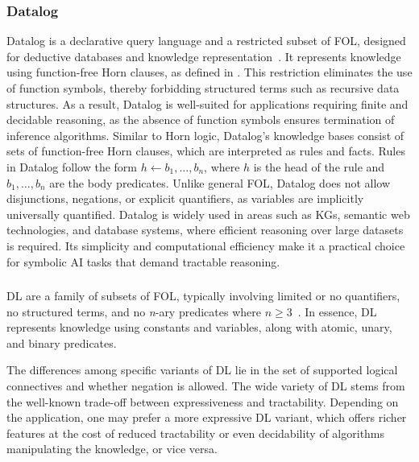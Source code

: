 \subsubsection{Datalog}\label{subsubsec:datalog}
%
Datalog is a declarative query language and a restricted subset of \gls{FOL}, designed for deductive databases and knowledge representation~\cite{DBLP:journals/jcss/AjtaiG94}.
%
It represents knowledge using function-free Horn clauses, as defined in .
%
This restriction eliminates the use of function symbols, thereby forbidding structured terms such as recursive data structures.
%
As a result, Datalog is well-suited for applications requiring finite and decidable reasoning, as the absence of function symbols ensures termination of inference algorithms.
%
Similar to Horn logic, Datalog's knowledge bases consist of sets of function-free Horn clauses, which are interpreted as rules and facts.
%
Rules in Datalog follow the form \(h \gets b_1, \dots, b_n\), where \(h\) is the head of the rule and \(b_1, \dots, b_n\) are the body predicates.
%
Unlike general \gls{FOL}, Datalog does not allow disjunctions, negations, or explicit quantifiers, as variables are implicitly universally quantified.
%
Datalog is widely used in areas such as \glspl{KG}, semantic web technologies, and database systems, where efficient reasoning over large datasets is required.
%
Its simplicity and computational efficiency make it a practical choice for symbolic \gls{AI} tasks that demand tractable reasoning.


\subsubsection[Description logic]{}\label{subsubsec:dl}
%
\Gls{DL} are a family of subsets of \gls{FOL}, typically involving limited or no quantifiers, no structured terms, and no \textit{n}-ary predicates where \(n \geq 3\)~\cite{DBLP:books/daglib/0041477}.
%
In essence, \gls{DL} represents knowledge using constants and variables, along with atomic, unary, and binary predicates.


The differences among specific variants of \gls{DL} lie in the set of supported logical connectives and whether negation is allowed.
%
The wide variety of \gls{DL} stems from the well-known trade-off between expressiveness and tractability.
%
Depending on the application, one may prefer a more expressive \gls{DL} variant, which offers richer features at the cost of reduced tractability or even decidability of algorithms manipulating the knowledge, or vice versa.


